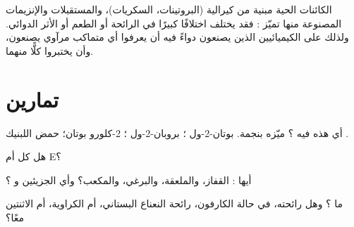 \begin{remark}\label{rem:g12:stereochemistry:matters}
الكائنات الحية مبنية من  كيرالية (البروتينات، السكريات)،
والمستقبلات والإنزيمات المصنوعة منها تميّز : فقد يختلف
 اختلافًا كبيرًا في الرائحة أو الطعم أو الأثر الدوائي. ولذلك
على الكيميائيين الذين يصنعون دواءً فيه  أن يعرفوا
أي متماكب مرآوي يصنعون، وأن يختبروا كلًّا منهما.
\end{remark}

\section{تمارين}

\begin{exercise}[$\star$]\label{exo:g12:stereochemistry:1}
أي هذه  فيه ؟ ميّزه بنجمة.
بوتان-2-ول ؛ بروبان-2-ول ؛
2-كلورو بوتان؛ حمض اللبنيك .
\end{exercise}

\begin{exercise}[$\star$]\label{exo:g12:stereochemistry:2}
هل كل  أم E؟
\begin{center}
 \qquad
{}
\end{center}
\end{exercise}

\begin{exercise}[$\star$]\label{exo:g12:stereochemistry:3}
أيها : القفاز، والملعقة، والبرغي، والمكعب؟ وأي
الجزيئين  و ؟
\end{exercise}

\begin{exercise}[$\star$]\label{exo:g12:stereochemistry:4}
ما ؟ وهل رائحته، في حالة الكارفون، رائحة النعناع البستاني، أم الكراوية، أم
الاثنتين معًا؟
\end{exercise}

